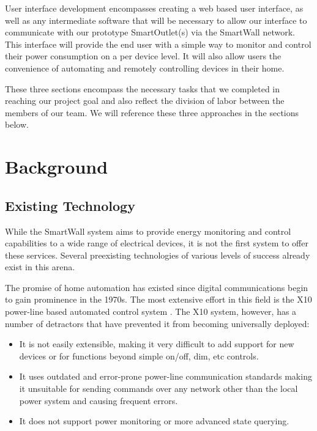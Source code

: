 \documentclass[11pt]{article}
\begin{document}
User interface development encompasses creating a web based user
interface, as well as any intermediate software that will be necessary
to allow our interface to communicate with our prototype
SmartOutlet(s) via the SmartWall network. This interface will provide
the end user with a simple way to monitor and control their power
consumption on a per device level. It will also allow users the
convenience of automating and remotely controlling devices in their home.

These three sections encompass the necessary tasks that we completed
in reaching our project goal and also reflect the division of labor
between the members of our team. We will reference these three
approaches in the sections below.

\section{Background}

\subsection{Existing Technology}

While the SmartWall system aims to provide energy monitoring and
control capabilities to a wide range of electrical devices, it is not the
first system to offer these services. Several preexisting technologies
of various levels of success already exist in this arena.

The promise of home automation has existed since digital communications
begin to gain prominence in the 1970s. The most extensive effort in this
field is the X10 power-line based automated control system
\cite{wiki-X10}. The X10 system, however, has a number of detractors
that have prevented it from becoming universally deployed:
\begin{itemize}
  \setlength{\itemsep}{0pt}
  \setlength{\parskip}{0pt}
  \setlength{\parsep}{0pt}
\item It is not easily extensible, making it very difficult to add
  support for new devices or for functions beyond simple on/off, dim,
  etc controls.
\item It uses outdated and error-prone power-line communication
  standards making it unsuitable for sending commands over any network
  other than the local power system and causing frequent errors.
\item It does not support power monitoring or more advanced state querying.
\end{itemize}  
\end{document}
